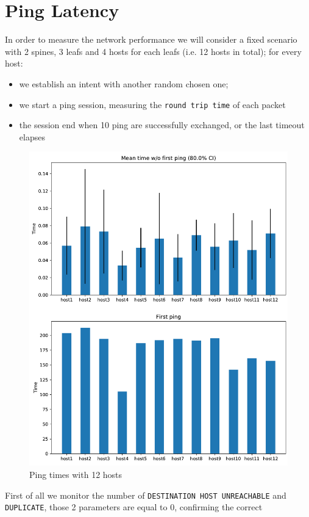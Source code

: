 \newpage
\section{Ping Latency}
In order to measure the network performance we will consider a fixed scenario with 2 spines, 3 leafs and 4 hosts for each leafs (i.e. 12 hosts in total);
for every host:
\begin{itemize}
    \item  we establish an intent with another random chosen one;
    \item  we start a ping session, measuring the \texttt{round trip time} of each packet
    \item  the session end when 10 ping are successfully exchanged, or the last timeout elapses
\end{itemize} 
\begin{figure}[h]
    \centering
    \includegraphics[width=.92\textwidth]{img/mean_ping_time.pdf}
    \caption{Ping times with 12 hosts}
    \label{img:perf1}
\end{figure}
First of all we monitor the number of \texttt{DESTINATION HOST UNREACHABLE} and \texttt{DUPLICATE}, those 2 parameters are equal to 0, confirming the correct
